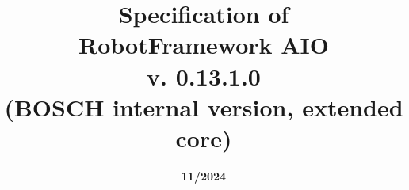 
\title{\textbf{Specification of \\
\vspace{2ex}
RobotFramework AIO \\
\vspace{2ex}
v. 0.13.1.0 \\
\vspace{2ex}
(BOSCH internal version, extended core)}}

\date{\vspace{4ex}\textbf{11/2024}}

